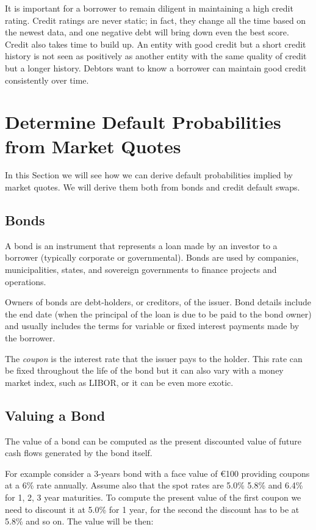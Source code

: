 {It is important for a borrower to remain diligent in maintaining a high
credit rating. Credit ratings are never static; in fact, they change all
the time based on the newest data, and one negative debt will bring down
even the best score. 
Credit also takes time to build up. An entity with
good credit but a short credit history is not seen as positively as
another entity with the same quality of credit but a longer history.
Debtors want to know a borrower can maintain good credit consistently
over time.

\section{Determine Default Probabilities from Market Quotes}
In this Section we will see how we can derive default probabilities implied by market quotes. We will derive them both from bonds and credit default swaps.

\subsection{Bonds}\label{bonds}

A bond is an instrument that represents a loan made by an investor to a
borrower (typically corporate or governmental). Bonds are used by
companies, municipalities, states, and sovereign governments to finance
projects and operations. 

Owners of bonds are debt-holders, or creditors,
of the issuer. Bond details include the end date (when the principal of
the loan is due to be paid to the bond owner) and usually includes the
terms for variable or fixed interest payments made by the borrower.

The \emph{coupon} is the interest rate that the issuer pays to the holder.
This rate can be fixed throughout the life of the bond but it can also
vary with a money market index, such as LIBOR, or it can be even more
exotic.

\subsection{Valuing a Bond}\label{sec:bond_pricing}

The value of a bond can be computed as the present discounted value of
future cash flows generated by the bond itself.

For example consider a 3-years bond with a face value of \euro{100}
providing coupons at a 6\% rate annually. Assume also that the spot
rates are 5.0\% 5.8\% and 6.4\% for 1, 2, 3 year maturities. To
compute the present value of the first coupon we need to discount it at
5.0\% for 1 year, for the second the discount has to be at 5.8\% and so
on. The value will be then:

}
